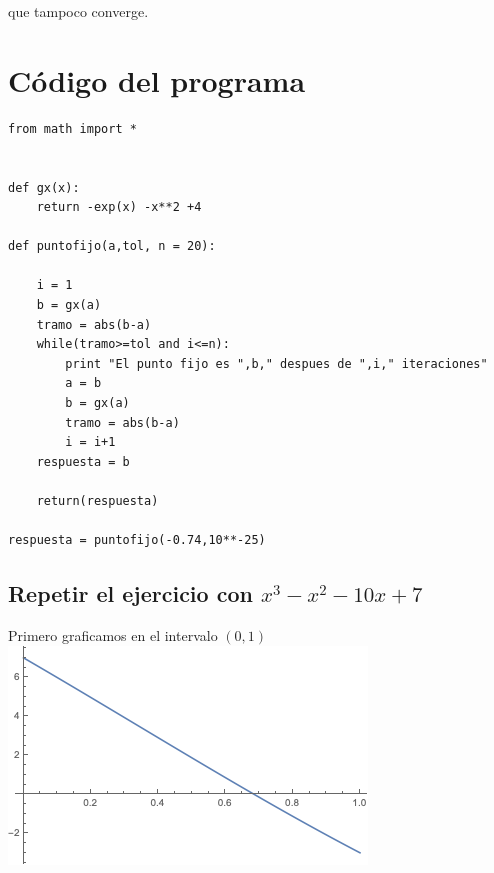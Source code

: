 \documentclass{article}
\begin{document}
que tampoco converge.

\section{Código del programa}

\begin{lstlisting}
from math import *


def gx(x):
    return -exp(x) -x**2 +4

def puntofijo(a,tol, n = 20):

    i = 1
    b = gx(a)
    tramo = abs(b-a)
    while(tramo>=tol and i<=n):
        print "El punto fijo es ",b," despues de ",i," iteraciones"
        a = b
        b = gx(a)
        tramo = abs(b-a)
        i = i+1
    respuesta = b

    return(respuesta)

respuesta = puntofijo(-0.74,10**-25)
\end{lstlisting}

\subsection{Repetir el ejercicio con $x^3-x^2-10x+7$}
Primero graficamos en el intervalo $(0,1)$
\includegraphics[scale=0.75]{grafica2.png}
\end{document}
